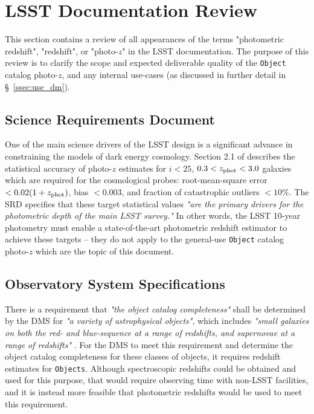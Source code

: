 \documentclass[DM,lsstdraft,toc]{lsstdoc}
\begin{document}
\clearpage
\section{LSST Documentation Review}\label{sec:docs}

This section contains a review of all appearances of the terms "photometric redshift", "redshift", or "photo-$z$" in the LSST documentation.
The purpose of this review is to clarify the scope and expected deliverable quality of the {\tt Object} catalog photo-$z$, and any internal use-cases (as discussed in further detail in \S~\ref{ssec:use_dm}).

\subsection{Science Requirements Document}\label{ssec:docs_srd}

One of the main science drivers of the LSST design is a significant advance in constraining the models of dark energy cosmology. 
Section 2.1 of  describes the statistical accuracy of photo-$z$ estimates for $i<25$, $0.3<z_{\rm phot}<3.0$ galaxies which are required for the cosmological probes: root-mean-square error $<0.02(1+z_{\rm phot})$, bias $<0.003$, and fraction of catastrophic outliers $<10\%$.
The SRD specifies that these target statistical values {\it "are the primary drivers for the photometric depth of the main LSST survey."} 
In other words, the LSST 10-year photometry must enable a state-of-the-art photometric redshift estimator to achieve these targets -- they do not apply to the general-use {\tt Object} catalog photo-$z$ which are the topic of this document.

\subsection{Observatory System Specifications}\label{ssec:docs_oss}

There is a requirement that {\it "the object catalog completeness"} shall be determined by the DMS for {\it "a variety of astrophysical objects"}, which includes {\it "small galaxies on both the red- and blue-sequence at a range of redshifts, and supernovae at a range of redshifts"} . 
For the DMS to meet this requirement and determine the object catalog completeness for these classes of objects, it requires redshift estimates for {\tt Objects}.
Although spectroscopic redshifts could be obtained and used for this purpose, that would require observing time with non-LSST facilities, and it is instead more feasible that photometric redshifts would be used to meet this requirement.
\end{document}
